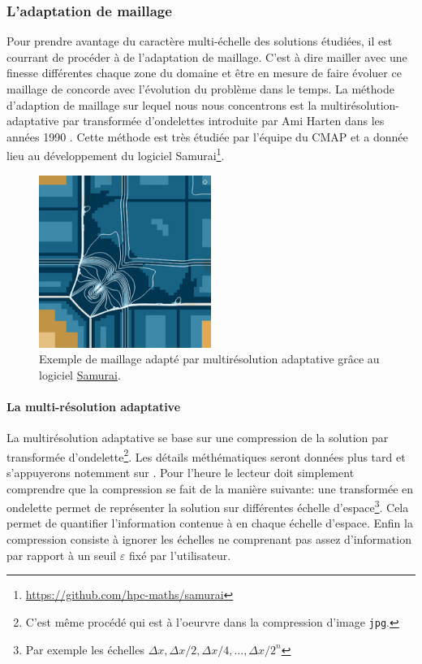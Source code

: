     \subsubsection{L'adaptation de maillage}
    Pour prendre avantage du caractère multi-échelle des solutions étudiées, il est courrant de procéder à de l'adaptation de maillage.
    C'est à dire mailler avec une finesse différentes chaque zone du domaine et être en mesure de faire évoluer ce maillage de concorde avec l'évolution du problème dans le temps.
    La méthode d'adaption de maillage sur lequel nous nous concentrons est la multirésolution-adaptative par transformée d'ondelettes introduite par Ami Harten dans les années 1990 \cite{harten1994}.
    Cette méthode est très étudiée par l'équipe du CMAP et a donnée lieu au développement du logiciel Samurai\footnote{\href{https://github.com/hpc-maths/samurai}{https://github.com/hpc-maths/samurai}}.
    \begin{figure}[h]
    \centering
    \includegraphics[width=0.5\textwidth]{media/3_/3_/exemple_compression_samurai.png}
    \caption{Exemple de maillage adapté par multirésolution adaptative grâce au logiciel \href{https://github.com/hpc-maths/samurai}{Samurai}.}
    \label{fig:samurai}
    \end{figure}

        \paragraph{La multi-résolution adaptative}
        La multirésolution adaptative se base sur une compression de la solution par transformée d'ondelette\footnote{C'est même procédé qui est à l'oeurvre dans la compression d'image \texttt{jpg}.}.
        Les détails méthématiques seront données plus tard et s'appuyerons notemment sur \cite{postePoly}. Pour l'heure le lecteur doit simplement comprendre que la compression se fait de la manière suivante:
        une transformée en ondelette permet de représenter la solution sur différentes échelle d'espace\footnote{Par exemple les échelles $\Delta x, \Delta x/2,\Delta x/4,\dots, \Delta x/2^n$}. 
        Cela permet de quantifier l'information contenue à en chaque échelle d'espace. Enfin la compression consiste à ignorer les échelles ne comprenant pas assez d'information
        par rapport à un seuil $\varepsilon$ fixé par l'utilisateur.

